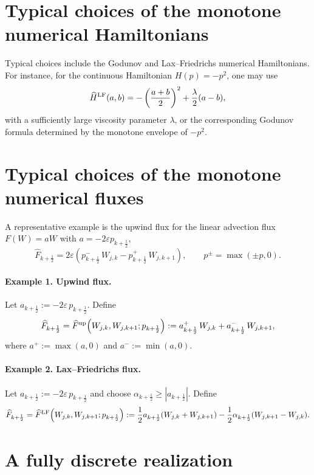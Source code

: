\documentclass[11pt, dina4, amsfont12]{article}
\begin{document}
\appendix
\section{Typical choices of the monotone numerical Hamiltonians}\label{append:HJ}

Typical choices include the Godunov and Lax--Friedrichs numerical Hamiltonians. For instance, for the continuous Hamiltonian $H(p)=-p^2$, one may use
\[
\widehat H^{\rm LF}(a,b)
=
-\left(\frac{a+b}{2}\right)^2 + \frac{\lambda}{2}(a-b),
\]
with a sufficiently large viscosity parameter $\lambda$, or the corresponding Godunov formula determined by the monotone envelope of $-p^2$.

\section{Typical choices of the monotone numerical fluxes}\label{append:flux}

A representative example is the upwind flux for the linear advection flux $F(W)=aW$ with $a=-2\varepsilon p_{k+\frac12}$,
\[
\widehat F_{k+\frac12}
=
2\varepsilon\!\left(
p_{k+\frac12}^-\, W_{j,k}
-
p_{k+\frac12}^+\, W_{j,k+1}
\right),
\qquad
p^\pm=\max(\pm p,0).
\]

\paragraph{Example 1. Upwind flux.}
Let $a_{k+\frac12}:=-2\varepsilon\,p_{k+\frac12}$. Define
\begin{equation}\label{eq:flux_upwind}
\widehat F_{k+\frac12}
=\widehat F^{\rm up}\!\left(W_{j,k},W_{j,k+1};p_{k+\frac12}\right)
:=a_{k+\frac12}^+\,W_{j,k}+a_{k+\frac12}^-\,W_{j,k+1},
\end{equation}
where $a^+:=\max(a,0)$ and $a^-:=\min(a,0)$.

\paragraph{Example 2. Lax--Friedrichs flux.}
Let $a_{k+\frac12}:=-2\varepsilon\,p_{k+\frac12}$ and choose
$\alpha_{k+\frac12}\ge |a_{k+\frac12}|$. Define
\begin{equation}\label{eq:flux_lf}
\widehat F_{k+\frac12}
=\widehat F^{\rm LF}\!\left(W_{j,k},W_{j,k+1};p_{k+\frac12}\right)
:=\frac12 a_{k+\frac12}(W_{j,k}+W_{j,k+1})
-\frac12 \alpha_{k+\frac12}(W_{j,k+1}-W_{j,k}).
\end{equation}

\section{A fully discrete realization}
\end{document}
